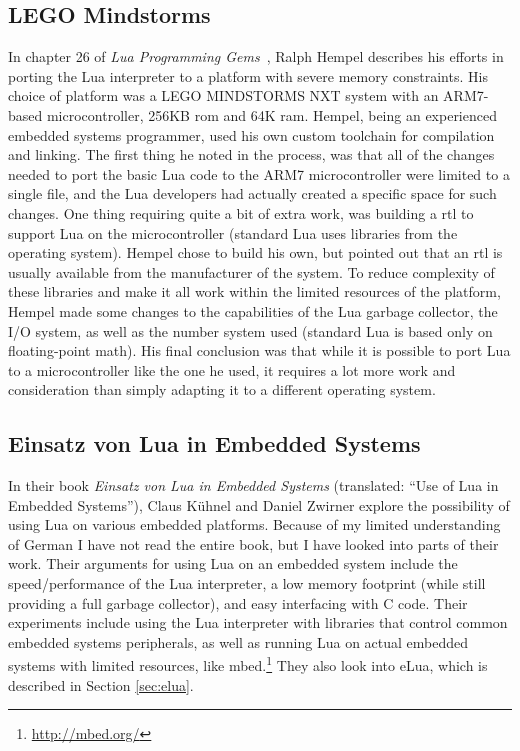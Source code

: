 \subsection{LEGO Mindstorms}
\label{sec:lego_mindstorms}
In chapter 26 of \emph{Lua Programming Gems}~\cite{chapter:porting_lua_microcontroller}, Ralph Hempel describes his efforts in porting the Lua interpreter to a platform with severe memory constraints. His choice of platform was a LEGO MINDSTORMS NXT system with an ARM7-based microcontroller, 256KB \gls{rom} and 64K \gls{ram}. Hempel, being an experienced embedded systems programmer, used his own custom toolchain for compilation and linking. The first thing he noted in the process, was that all of the changes needed to port the basic Lua code to the ARM7 microcontroller were limited to a single file, and the Lua developers had actually created a specific space for such changes. One thing requiring quite a bit of extra work, was building a \gls{rtl} to support Lua on the microcontroller (standard Lua uses libraries from the operating system). Hempel chose to build his own, but pointed out that an \gls{rtl} is usually available from the manufacturer of the system. To reduce complexity of these libraries and make it all work within the limited resources of the platform, Hempel made some changes to the capabilities of the Lua garbage collector, the I/O system, as well as the number system used (standard Lua is based only on floating-point math). His final conclusion was that while it is possible to port Lua to a microcontroller like the one he used, it requires a lot more work and consideration than simply adapting it to a different operating system.

\subsection{Einsatz von Lua in Embedded Systems}
\label{sec:einsatz_von_lua_embedded}
In their book \emph{Einsatz von Lua in Embedded Systems}\cite{book:einsatz_von_lua_embedded} (translated: ``Use of Lua in Embedded Systems''), Claus Kühnel and Daniel Zwirner explore the possibility of using Lua on various embedded platforms. Because of my limited understanding of German I have not read the entire book, but I have looked into parts of their work. Their arguments for using Lua on an embedded system include the speed/performance of the Lua interpreter, a low memory footprint (while still providing a full garbage collector), and easy interfacing with C code. Their experiments include using the Lua interpreter with libraries that control common embedded systems peripherals, as well as running Lua on actual embedded systems with limited resources, like mbed.\footnote{\url{http://mbed.org/}} They also look into eLua, which is described in Section \ref{sec:elua}.

